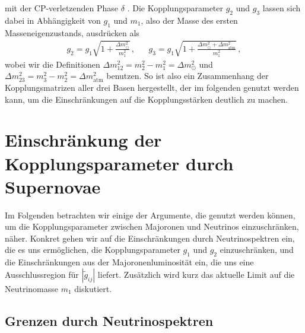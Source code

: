 mit der CP-verletzenden Phase $\delta$ \cite{päspaper}.
Die Kopplungsparameter $g_2$ und $g_3$ lassen sich dabei in Abhängigkeit von $g_1$ und $m_1$, also der Masse des ersten Masseneigenzustands, ausdrücken als
\begin{align}
    g_2 = g_1 \sqrt{1 + \frac{\Delta m^2_\odot}{m^2_1}}\,, && g_3 = g_1 \sqrt{1 + \frac{\Delta m^2_\odot + \Delta m^2_\text{atm}}{m^2_1}} \,,
    \label{eq:g2g3}
\end{align}
wobei wir die Definitionen $\Delta m^2_{1 2} = m^2_2 - m^2_1 = \Delta m^2_\odot$ und $\Delta m^2_{23} = m^2_3 - m^2_2 = \Delta m^2_\text{atm}$ benutzen.
So ist also ein Zusammenhang der Kopplungsmatrizen aller drei Basen hergestellt, der im folgenden genutzt werden kann, um die Einschränkungen auf die Kopplungsstärken deutlich zu machen.


\section{Einschränkung der Kopplungsparameter durch Supernovae}

Im Folgenden betrachten wir einige der Argumente, die genutzt werden können, um die Kopplungsparameter zwischen Majoronen und Neutrinos einzuschränken, näher.
Konkret gehen wir auf die Einschränkungen durch Neutrinospektren ein, die es uns ermöglichen, die Kopplungsparameter $g_1$ und $g_2$ einzuschränken, und die Einschränkungen aus der Majoronenluminosität ein,
die uns eine Ausschlussregion für $|\tilde{g}_{i j}|$ liefert.
Zusätzlich wird kurz das aktuelle Limit auf die Neutrinomasse $m_1$ diskutiert.

\subsection{Grenzen durch Neutrinospektren}
\label{subsec:spektrengrenzen}

